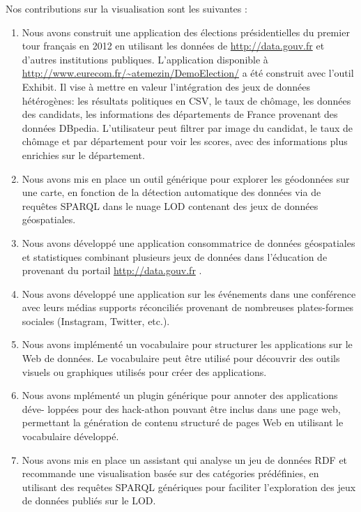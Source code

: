 Nos contributions sur la visualisation sont les suivantes :
\begin{enumerate}
 \item Nous avons construit une application des \'{e}lections pr\'{e}sidentielles du premier tour fran\c{c}ais en 2012 en utilisant les donn\'{e}es de \url{http://data.gouv.fr} et d'autres institutions publiques. L'application disponible \`{a} \url{http://www.eurecom.fr/~atemezin/DemoElection/} a \'{e}t\'{e} construit avec l'outil Exhibit. Il vise \`{a} mettre en valeur l'int\'{e}gration des jeux de donn\'{e}es h\'{e}t\'{e}rog\`{e}nes: les r\'{e}sultats politiques en CSV, le taux de chômage, les donn\'{e}es des candidats, les informations des d\'{e}partements de France provenant des donn\'{e}es DBpedia. L'utilisateur peut filtrer par image du candidat, le taux de chômage et par d\'{e}partement pour voir les scores, avec des informations plus enrichies sur le d\'{e}partement.
 \item Nous avons mis en place un outil g\'{e}n\'{e}rique pour explorer les g\'{e}odonn\'{e}es sur une carte, en fonction de la d\'{e}tection automatique des donn\'{e}es via de requ\^{e}tes SPARQL dans le nuage LOD contenant des jeux de donn\'{e}es g\'{e}ospatiales.
 \item Nous avons d\'{e}velopp\'{e} une application consommatrice de donn\'{e}es g\'{e}ospatiales et statistiques combinant plusieurs jeux de donn\'{e}es dans l'\'{e}ducation de provenant du portail \url{http://data.gouv.fr} .
 \item Nous avons d\'{e}velopp\'{e} une application sur les \'{e}v\'{e}nements dans une conf\'{e}rence avec leurs m\'{e}dias supports r\'{e}concili\'{e}s provenant de nombreuses plates-formes sociales (Instagram, Twitter, etc.).
 \item Nous avons impl\'{e}ment\'{e} un vocabulaire pour structurer les applications sur le Web de donn\'{e}es. Le vocabulaire peut \^{e}tre utilis\'{e} pour d\'{e}couvrir des outils visuels ou graphiques utilis\'{e}s pour cr\'{e}er des applications.
 \item Nous avons mpl\'{e}ment\'{e} un plugin g\'{e}n\'{e}rique pour annoter des applications d\'{e}ve- lopp\'{e}es pour des hack-athon pouvant \^{e}tre inclus dans une page web, permettant la g\'{e}n\'{e}ration de contenu structur\'{e} de pages Web en utilisant le vocabulaire d\'{e}velopp\'{e}.
 \item Nous avons mis en place un assistant qui analyse un jeu de donn\'{e}es RDF et  recommande une visualisation bas\'{e}e sur des cat\'{e}gories pr\'{e}d\'{e}finies, en utilisant des requ\^{e}tes SPARQL g\'{e}n\'{e}riques pour faciliter l'exploration des jeux de donn\'{e}es publi\'{e}s sur le LOD.
\end{enumerate}

